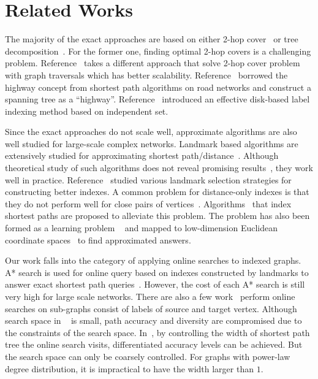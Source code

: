 \section{Related Works}
\label{relatedwork} 

The majority of the exact approaches are based on either 2-hop cover~\cite{Cohen:2002:RDQ:545381.545503,Akiba:2013:FES:2463676.2465315} or tree decomposition~\cite{Akiba:2012:SQC:2247596.2247614,Wei:2010:TES:1807167.1807181}. For the former one, finding optimal 2-hop covers is a challenging problem. Reference~\cite{Akiba:2013:FES:2463676.2465315} takes a different approach that solve 2-hop cover problem with graph traversals which has better scalability. Reference~\cite{Jin:2012:HLA:2213836.2213887} borrowed the highway concept from shortest path algorithms on road networks and construct a spanning tree as a "`highway"'. Reference~\cite{Fu:2013:IIB:2536336.2536346} introduced an effective disk-based label indexing method based on independent set.

Since the exact approaches do not scale well, approximate algorithms are also well studied for large-scale complex networks. Landmark based algorithms are extensively studied for approximating shortest path/distance~\cite{Thorup:2005:ADO:1044731.1044732,Goldberg:2005:CSP:1070432.1070455,Potamias:2009:FSP:1645953.1646063,floreskul2014memory,Maier:2011:INS:1993077.1993079}. Although theoretical study of such algorithms does not reveal promising results~\cite{Thorup:2005:ADO:1044731.1044732}, they work well in practice. Reference~\cite{Potamias:2009:FSP:1645953.1646063,6927522} studied various landmark selection strategies for constructing better indexes. A common problem for distance-only indexes is that they do not perform well for close pairs of vertices~\cite{Akiba:2012:SQC:2247596.2247614}. Algorithms~\cite{Gubichev:2010:FAE:1871437.1871503,tretyakov2011fast,6399472} that index shortest paths are proposed to alleviate this problem. The problem has also been formed as a learning problem ~\cite{7004250} and mapped to low-dimension Euclidean coordinate spaces~\cite{Zhao:2010:OSP:1863190.1863199} to find approximated answers.

Our work falls into the category of applying online searches to indexed graphs. A* search is used for online query based on indexes constructed by landmarks to answer exact shortest path queries~\cite{Goldberg:2005:CSP:1070432.1070455}. However, the cost of each A* search is still very high for large scale networks. There are also a few work~\cite{Gubichev:2010:FAE:1871437.1871503, 6399472} perform online searches on sub-graphs consist of labels of source and target vertex. Although search space in ~\cite{Gubichev:2010:FAE:1871437.1871503} is small, path accuracy and diversity are compromised due to the constraints of the search space. In~\cite{6399472}, by controlling the width of shortest path tree the online search visits, differentiated accuracy levels can be achieved. But the search space can only be coarsely controlled. For graphs with power-law degree distribution, it is impractical to have the width larger than $1$.
